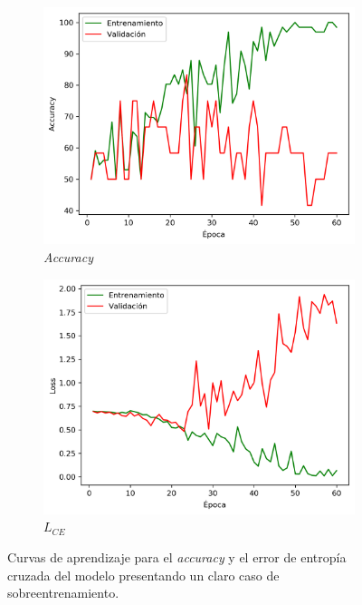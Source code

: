 \begin{figure}[h]
    \begin{subfigure}{0.5\linewidth}
        \centering
        \includegraphics[width=\linewidth]{imagenes/experiments/Nodule-98-50K-5rev_Accuracy.png}
        \caption{\textit{Accuracy}}
        \label{subfig:acc_nodule-98-30K-7rev}
    \end{subfigure}
    \begin{subfigure}{0.5\linewidth}
        \centering
        \includegraphics[width=\linewidth]{imagenes/experiments/Nodule-98-50K-5rev_Loss.png}
        \caption{$L_{CE}$}
        \label{subfig:loss_nodule-98-30K-7rev}
    \end{subfigure}
    \caption[Nodule-98-30K-5rev: Curvas de aprendizaje]{Curvas de aprendizaje para el \textit{accuracy} y el error de entropía cruzada del modelo  presentando un claro caso de sobreentrenamiento.}
    \label{fig:nodule-98-30K-7rev}
\end{figure}

